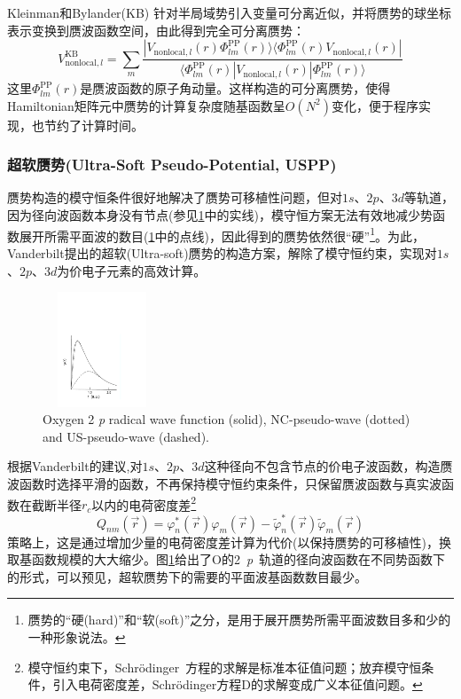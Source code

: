 {\textrm{Kleinman}和\textrm{Bylander}\textrm{(KB)}%
针对半局域势引入变量可分离近似，并将赝势的球坐标表示变换到赝波函数空间，由此得到完全可分离赝势：
$$V_{\mathrm{nonlocal},l}^{\mathrm{KB}}=\sum_m\dfrac{|V_{\mathrm{nonlocal},l}(r)\Phi_{lm}^{\mathrm{PP}}(r)\rangle\langle\Phi_{lm}^{\mathrm{PP}}(r)V_{\mathrm{nonlocal},l}(r)|}{\langle\Phi_{lm}^{\mathrm{PP}}(r)|V_{\mathrm{nonlocal},l}(r)|\Phi_{lm}^{\mathrm{PP}}(r)\rangle}$$
这里$\Phi_{lm}^{\mathrm{PP}}(r)$是赝波函数的原子角动量。这样构造的可分离赝势，使得Hamiltonian矩阵元中赝势的计算复杂度随基函数呈$O(N^2)$变化，便于程序实现，也节约了计算时间。

\subsubsection{超软赝势\textrm{(Ultra-Soft Pseudo-Potential, USPP)}}
赝势构造的模守恒条件很好地解决了赝势可移植性问题，但对$1s$、$2p$、$3d$等轨道，因为径向波函数本身没有节点(参见\ref{Norm-US-wave}中的实线)，模守恒方案无法有效地减少势函数展开所需平面波的数目(\ref{Norm-US-wave}中的点线)，因此得到的赝势依然很“硬”\footnote{赝势的“硬(hard)”和“软(soft)”之分，是用于展开赝势所需平面波数目多和少的一种形象说法。}。为此，\textrm{Vanderbilt}提出的超软\textrm{(Ultra-soft)}赝势\cite{PRB41-7892_1990}的构造方案，解除了模守恒约束，实现对$1s$、$2p$、$3d$为价电子元素的高效计算。
\begin{figure}[h!]
\centering
\includegraphics[height=1.35in,width=1.40in,viewport=30 55 415 500,clip]{Figures/Norm-US-wave.pdf}
\caption{\small \textrm{Oxygen 2} \textit{p} \textrm{radical wave function (solid), NC-pseudo-wave (dotted) and US-pseudo-wave (dashed).}}%
\label{Norm-US-wave}
\end{figure}

根据\textrm{Vanderbilt}的建议,对$1s$、$2p$、$3d$这种径向不包含节点的价电子波函数，构造赝波函数时选择平滑的函数，不再保持模守恒约束条件，只保留赝波函数与真实波函数在截断半径$r_c$以内的电荷密度差\footnote{模守恒约束下，\textrm{Schr\"odinger~}方程的求解是标准本征值问题；放弃模守恒条件，引入电荷密度差，\textrm{Schr\"odinger}方程D的求解变成广义本征值问题。}
\begin{equation}
	Q_{nm}(\vec r)=\varphi_n^{\ast}(\vec r)\varphi_m(\vec r)-\tilde\varphi_n^{\ast}(\vec r)\tilde\varphi_m(\vec r)
  \label{eq:uspp_4}
\end{equation}
策略上，这是通过增加少量的电荷密度差计算为代价(以保持赝势的可移植性)，换取基函数规模的大大缩少。图\ref{Norm-US-wave}给出了\textrm{O}的2~\textit{p}~轨道的径向波函数在不同势函数下的形式，可以预见，超软赝势下的需要的平面波基函数数目最少。

}
